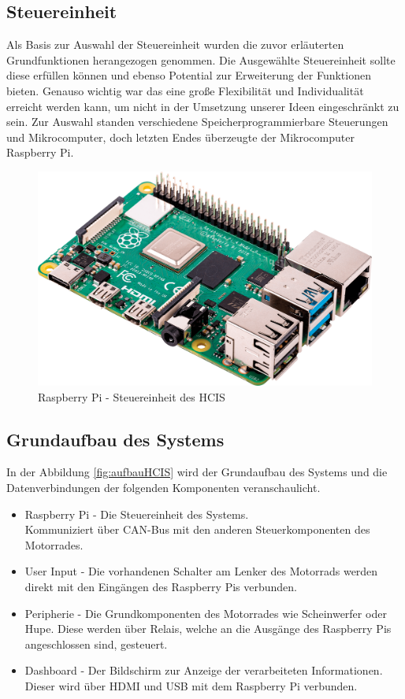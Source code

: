 \subsection{Steuereinheit}
Als Basis zur Auswahl der Steuereinheit wurden die zuvor erläuterten Grundfunktionen herangezogen genommen. Die Ausgewählte Steuereinheit sollte diese erfüllen können und ebenso Potential zur Erweiterung der Funktionen bieten. Genauso wichtig war das eine große Flexibilität und Individualität erreicht werden kann, um nicht in der Umsetzung unserer Ideen eingeschränkt zu sein. Zur Auswahl standen verschiedene Speicherprogrammierbare Steuerungen und Mikrocomputer, doch letzten Endes überzeugte der Mikrocomputer Raspberry Pi.

\begin{figure}[H]
	\begin{center}
		\includegraphics[scale=0.08]{figures/hcis/raspberryPi.png}
		\caption{Raspberry Pi - Steuereinheit des HCIS}
	\end{center}
\end{figure}

\subsection{Grundaufbau des Systems}
In der Abbildung \ref{fig:aufbauHCIS} wird der Grundaufbau des Systems und die Datenverbindungen der folgenden  Komponenten veranschaulicht.

\begin{itemize}
	\item Raspberry Pi - Die Steuereinheit des Systems.
	\\ Kommuniziert über CAN-Bus mit den anderen Steuerkomponenten des Motorrades.
	\item User Input - Die vorhandenen Schalter am Lenker des Motorrads werden direkt mit den Eingängen des Raspberry Pis verbunden. 
	\item Peripherie - Die Grundkomponenten des Motorrades wie Scheinwerfer oder Hupe. Diese werden über Relais, welche an die Ausgänge des Raspberry Pis angeschlossen sind, gesteuert.
	\item Dashboard - Der Bildschirm zur Anzeige der verarbeiteten Informationen. Dieser wird über HDMI und USB mit dem Raspberry Pi verbunden.
\end{itemize}

